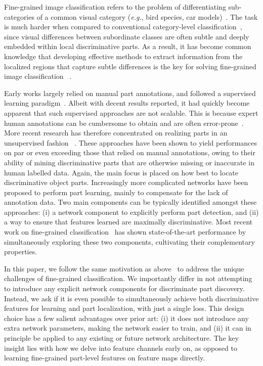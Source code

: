 \documentclass[journal]{IEEEtran}
\begin{document}
Fine-grained image classification refers to the problem of differentiating sub-categories of a common visual category (\emph{e.g.}, bird species, car models)~\cite{lin2015bilinear}. The task is much harder when compared to conventional category-level classification~\cite{ma2018variational,ma2019insights}, since visual differences between subordinate classes are often subtle and deeply embedded within local discriminative parts. As a result, it has become common knowledge that developing effective methods to extract information from the localized regions that capture subtle differences is the key for solving fine-grained image classification ~\cite{wang2018learning,yang2018learning,zhang2019fine}.

Early works largely relied on manual part annotations, and followed a supervised learning paradigm~\cite{berg2013poof,li2019dual,xie2013hierarchical,branson2014bird,ma2019fine,lei2016fast}. Albeit with decent results reported, it had quickly become apparent that such supervised approaches are not scalable. This is because expert human annotations can be cumbersome to obtain and are often error-prone~\cite{volkmer2005web}. More recent research has therefore concentrated on realizing parts in an unsupervised fashion ~\cite{lin2015bilinear,song2017parameter,zhang2016picking,Peng2018Object,cong2017iterative,wei2019adversarial,deng2019unsupervised}. These approaches have been shown to yield performances on par or even exceeding those that relied on manual annotations, owing to their ability of mining discriminative parts that are otherwise missing or inaccurate in human labelled data. Again, the main focus is placed on how best to locate discriminative object parts. Increasingly more complicated networks have been proposed to perform part learning, mainly to compensate for the lack of annotation data. Two main components can be typically identified amongst these approaches: (i) a network component to explicitly perform part detection, and (ii) a way to ensure that features learned are maximally discriminative. Most recent work on fine-grained classification~\cite{wang2018learning,yang2018learning,zheng2017learning,fu2017look,lei2019semi} has shown state-of-the-art performance by simultaneously exploring these two components, cultivating their complementary properties.

In this paper, we follow the same motivation as above~\cite{zhang2016picking,wang2015multiple,zheng2017learning} to address the unique challenges of fine-grained classification. We importantly differ in 
not attempting to introduce any explicit network components for discriminate part discovery. Instead, we ask if it is even possible to simultaneously achieve both discriminative features for learning and part localization, with just a single loss. This design choice has a few salient advantages over prior art: (i) it does not introduce any extra network parameters, making the network easier to train, and (ii) it can in principle be applied to any existing or future network architecture. The key insight lies with how we delve into feature channels early on, as opposed to learning fine-grained part-level features on feature maps directly.
\end{document}
